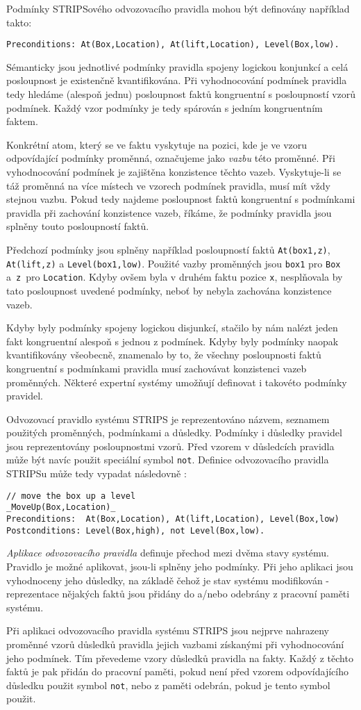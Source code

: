 Podmínky STRIPSového odvozovacího pravidla mohou být definovány například takto:
\begin{verbatim}
Preconditions: At(Box,Location), At(lift,Location), Level(Box,low).
\end{verbatim}
Sémanticky jsou jednotlivé podmínky pravidla spojeny logickou konjunkcí a celá
posloupnost je existenčně kvantifikována. Při vyhodnocování podmínek pravidla
tedy hledáme (alespoň jednu) posloupnost faktů kongruentní s posloupností vzorů
podmínek. Každý vzor podmínky je tedy spárován s jedním kongruentním faktem.

Konkrétní atom, který se ve faktu vyskytuje na pozici, kde je ve vzoru
odpovídající podmínky proměnná, označujeme jako \emph{vazbu} této proměnné. Při
vyhodnocování podmínek je zajištěna konzistence těchto vazeb. Vyskytuje-li se
táž proměnná na více místech ve vzorech podmínek pravidla, musí mít vždy stejnou
vazbu. Pokud tedy najdeme posloupnost faktů kongruentní s podmínkami pravidla
při zachování konzistence vazeb, říkáme, že podmínky pravidla jsou splněny touto
posloupností faktů.

Předchozí podmínky jsou splněny například posloupností faktů \verb|At(box1,z)|,
\verb|At(lift,z)| a \verb|Level(box1,low)|. Použité vazby proměnných jsou
\verb|box1| pro \verb|Box| a~\verb|z|~pro \verb|Location|. Kdyby ovšem byla v
druhém faktu pozice \verb|x|, nesplňovala by tato posloupnost uvedené podmínky,
neboť by nebyla zachována konzistence vazeb.

Kdyby byly podmínky spojeny logickou disjunkcí, stačilo by nám nalézt jeden
fakt kongruentní alespoň s jednou z podmínek. Kdyby byly podmínky naopak
kvantifikovány všeobecně, znamenalo by to, že všechny posloupnosti faktů
kongruentní s podmínkami pravidla musí zachovávat konzistenci vazeb proměnných.
Některé expertní systémy umožňují definovat i takovéto podmínky pravidel.

Odvozovací pravidlo systému STRIPS je reprezentováno názvem, seznamem použitých
proměnných, podmínkami a důsledky. Podmínky i důsledky pravidel jsou
reprezentovány posloupnostmi vzorů. Před vzorem v důsledcích pravidla může být
navíc použit speciální symbol \verb|not|. Definice odvozovacího pravidla STRIPSu
může tedy vypadat následovně \cite{strips}:
\begin{verbatim}
// move the box up a level
_MoveUp(Box,Location)_
Preconditions:  At(Box,Location), At(lift,Location), Level(Box,low)
Postconditions: Level(Box,high), not Level(Box,low).
\end{verbatim}

\emph{Aplikace odvozovacího pravidla} definuje přechod mezi dvěma stavy
systému. Pravidlo je možné aplikovat, jsou-li splněny jeho podmínky. Při jeho
aplikaci jsou vyhodnoceny jeho důsledky, na základě čehož je stav systému
modifikován - reprezentace nějakých faktů jsou přidány do a/nebo odebrány z
pracovní paměti systému.

Při aplikaci odvozovacího pravidla systému STRIPS jsou nejprve nahrazeny
proměnné vzorů důsledků pravidla jejich vazbami získanými při vyhodnocování
jeho podmínek. Tím převedeme vzory důsledků pravidla na fakty. Každý z těchto
faktů je pak přidán do pracovní paměti, pokud není před vzorem odpovídajícího
důsledku použit symbol \verb|not|, nebo z paměti odebrán, pokud je tento symbol
použit.
